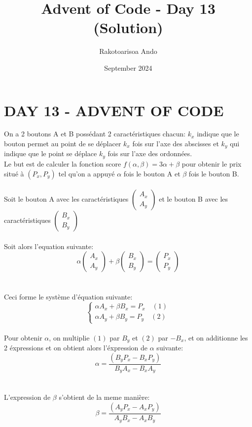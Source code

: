 \documentclass{article}
\title{Advent of Code - Day 13 (Solution)}
\author{Rakotoarisoa Ando}
\date{September 2024}
\begin{document}
\maketitle

\section{DAY 13 - ADVENT OF CODE}
On a 2 boutons A et B possédant 2 caractéristiques chacun: $k_x$ indique que le bouton permet au point de se déplacer $k_x$ fois sur l'axe des abscisses et $k_y$ qui indique que le point se déplace $k_y$ fois sur l'axe des ordonnées. 
\\Le but est de calculer la fonction score $f(\alpha, \beta) = 3\alpha + \beta$ pour obtenir le prix situé à $(P_x, P_y)$ tel qu'on a appuyé $\alpha$ fois le bouton A et $\beta$ fois le bouton B.
\\\\Soit le bouton A avec les caractéristiques $\begin{pmatrix}A_x\\A_y\end{pmatrix}$ et le bouton B avec les caractéristiques $\begin{pmatrix}B_x\\B_y\end{pmatrix}$
\\\\Soit alors l'equation suivante:
    $$\alpha\begin{pmatrix}A_x\\A_y\end{pmatrix} + \beta\begin{pmatrix}B_x\\B_y\end{pmatrix} = \begin{pmatrix}P_x\\P_y\end{pmatrix}$$
\\\\ Ceci forme le système d'équation suivante:
$$\begin{cases}
    \alpha A_x + \beta B_x = P_x\quad (1)\\
    \alpha A_y + \beta B_y = P_y \quad (2)
\end{cases}$$
\\Pour obtenir $\alpha$, on multiplie $(1)$ par $B_y$ et $(2)$ par $-B_x$, et on additionne les 2 éxpressions et on obtient alors l'éxpression de $\alpha$ suivante:
$$\alpha = \frac{(B_yP_x - B_xP_y)}{B_yA_x - B_xA_y}$$
\\\\L'expression de $\beta$ s'obtient de la meme manière:
$$\beta = \frac{(A_yP_x - A_xP_y)}{A_yB_x - A_xB_y}$$
\end{document}
